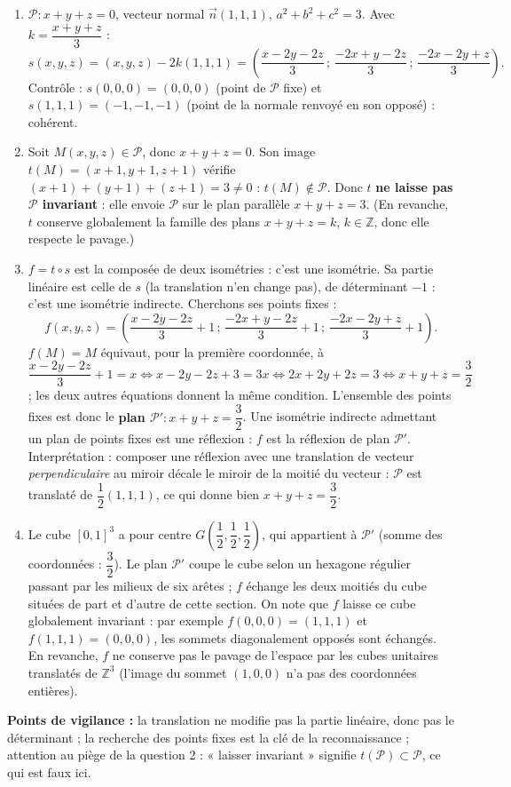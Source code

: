 \documentclass[11pt]{article}
\newcommand{\cle}[1]{{\popxbold\color{popdark}#1}}
\begin{document}
\begin{corrige}
\begin{enumerate}
\item $\mathcal{P}:x+y+z=0$, vecteur normal $\vec{n}(1,1,1)$, $a^2+b^2+c^2=3$. Avec $k=\dfrac{x+y+z}{3}$ :
\[ s(x,y,z)=(x,y,z)-2k(1,1,1)=\left(\frac{x-2y-2z}{3}\,;\,\frac{-2x+y-2z}{3}\,;\,\frac{-2x-2y+z}{3}\right). \]
Contrôle : $s(0,0,0)=(0,0,0)$ (point de $\mathcal{P}$ fixe) et $s(1,1,1)=(-1,-1,-1)$ (point de la normale renvoyé en son opposé) : cohérent.
\item Soit $M(x,y,z)\in\mathcal{P}$, donc $x+y+z=0$. Son image $t(M)=(x+1,y+1,z+1)$ vérifie $(x+1)+(y+1)+(z+1)=3\neq 0$ : $t(M)\notin\mathcal{P}$. Donc $t$ \textbf{ne laisse pas $\mathcal{P}$ invariant} : elle envoie $\mathcal{P}$ sur le plan parallèle $x+y+z=3$. (En revanche, $t$ conserve globalement la famille des plans $x+y+z=k$, $k\in\mathbb{Z}$, donc elle respecte le pavage.)
\item $f=t\circ s$ est la composée de deux isométries : c'est une \cle{isométrie}. Sa partie linéaire est celle de $s$ (la translation n'en change pas), de déterminant $-1$ : c'est une isométrie indirecte. Cherchons ses points fixes :
\[ f(x,y,z)=\left(\frac{x-2y-2z}{3}+1\,;\,\frac{-2x+y-2z}{3}+1\,;\,\frac{-2x-2y+z}{3}+1\right). \]
$f(M)=M$ équivaut, pour la première coordonnée, à $\dfrac{x-2y-2z}{3}+1=x\iff x-2y-2z+3=3x\iff 2x+2y+2z=3\iff x+y+z=\dfrac{3}{2}$ ; les deux autres équations donnent la même condition. L'ensemble des points fixes est donc le \textbf{plan $\mathcal{P}':x+y+z=\dfrac{3}{2}$}. Une isométrie indirecte admettant un plan de points fixes est une \cle{réflexion} : $f$ est la réflexion de plan $\mathcal{P}'$.
Interprétation : composer une réflexion avec une translation de vecteur \emph{perpendiculaire} au miroir décale le miroir de la moitié du vecteur : $\mathcal{P}$ est translaté de $\dfrac{1}{2}(1,1,1)$, ce qui donne bien $x+y+z=\dfrac{3}{2}$.
\item Le cube $[0,1]^3$ a pour centre $G\left(\dfrac{1}{2},\dfrac{1}{2},\dfrac{1}{2}\right)$, qui appartient à $\mathcal{P}'$ (somme des coordonnées : $\dfrac{3}{2}$). Le plan $\mathcal{P}'$ coupe le cube selon un hexagone régulier passant par les milieux de six arêtes ; $f$ échange les deux moitiés du cube situées de part et d'autre de cette section. On note que $f$ laisse ce cube globalement invariant : par exemple $f(0,0,0)=(1,1,1)$ et $f(1,1,1)=(0,0,0)$, les sommets diagonalement opposés sont échangés. En revanche, $f$ ne conserve pas le pavage de l'espace par les cubes unitaires translatés de $\mathbb{Z}^3$ (l'image du sommet $(1,0,0)$ n'a pas des coordonnées entières).
\end{enumerate}
\textbf{Points de vigilance :} la translation ne modifie pas la partie linéaire, donc pas le déterminant ; la recherche des points fixes est la clé de la reconnaissance ; attention au piège de la question 2 : « laisser invariant » signifie $t(\mathcal{P})\subset\mathcal{P}$, ce qui est faux ici.
\end{corrige}
\end{document}
